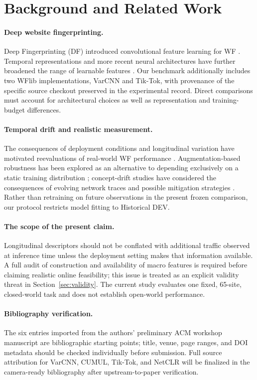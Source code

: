 \section{Background and Related Work}\label{sec:related}
\paragraph{Deep website fingerprinting.} Deep Fingerprinting (DF) introduced convolutional feature learning for WF \citep{sirinam2018deep}. Temporal representations and more recent neural architectures have further broadened the range of learnable features \citep{zhou2024transformer}. Our benchmark additionally includes two WFlib implementations, VarCNN and Tik-Tok, with provenance of the specific source checkout preserved in the experimental record. Direct comparisons must account for architectural choices as well as representation and training-budget differences.

\paragraph{Temporal drift and realistic measurement.} The consequences of deployment conditions and longitudinal variation have motivated reevaluations of real-world WF performance \citep{jansen2024repositioning}. Augmentation-based robustness has been explored as an alternative to depending exclusively on a static training distribution \citep{bahramali2023realistic}; concept-drift studies have considered the consequences of evolving network traces and possible mitigation strategies \citep{shusterman2026drift}. Rather than retraining on future observations in the present frozen comparison, our protocol restricts model fitting to Historical DEV.

\paragraph{The scope of the present claim.} Longitudinal descriptors should not be conflated with additional traffic observed at inference time unless the deployment setting makes that information available. A full audit of construction and availability of macro features is required before claiming realistic online feasibility; this issue is treated as an explicit validity threat in Section~\ref{sec:validity}. The current study evaluates one fixed, 65-site, closed-world task and does not establish open-world performance.

\paragraph{Bibliography verification.} The six entries imported from the authors' preliminary ACM workshop manuscript are bibliographic starting points; title, venue, page ranges, and DOI metadata should be checked individually before submission. Full source attribution for VarCNN, CUMUL, Tik-Tok, and NetCLR will be finalized in the camera-ready bibliography after upstream-to-paper verification.
